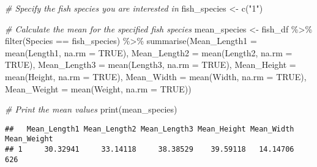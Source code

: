 \documentclass[
]{article}
\newenvironment{Shaded}{\begin{snugshade}}{\end{snugshade}}
\newcommand{\AttributeTok}[1]{\textcolor[rgb]{0.77,0.63,0.00}{#1}}
\newcommand{\CommentTok}[1]{\textcolor[rgb]{0.56,0.35,0.01}{\textit{#1}}}
\newcommand{\ConstantTok}[1]{\textcolor[rgb]{0.00,0.00,0.00}{#1}}
\newcommand{\FunctionTok}[1]{\textcolor[rgb]{0.00,0.00,0.00}{#1}}
\newcommand{\NormalTok}[1]{#1}
\newcommand{\OtherTok}[1]{\textcolor[rgb]{0.56,0.35,0.01}{#1}}
\newcommand{\SpecialCharTok}[1]{\textcolor[rgb]{0.00,0.00,0.00}{#1}}
\newcommand{\StringTok}[1]{\textcolor[rgb]{0.31,0.60,0.02}{#1}}
\begin{document}
\begin{Shaded}
\begin{Highlighting}[]
\CommentTok{\# Specify the fish species you are interested in}
\NormalTok{fish\_species }\OtherTok{\textless{}{-}} \FunctionTok{c}\NormalTok{(}\StringTok{"1"}\NormalTok{)}

\CommentTok{\# Calculate the mean for the specified fish species}
\NormalTok{mean\_species }\OtherTok{\textless{}{-}}\NormalTok{ fish\_df }\SpecialCharTok{\%\textgreater{}\%}
  \FunctionTok{filter}\NormalTok{(Species }\SpecialCharTok{==}\NormalTok{ fish\_species) }\SpecialCharTok{\%\textgreater{}\%}
  \FunctionTok{summarise}\NormalTok{(}\AttributeTok{Mean\_Length1 =} \FunctionTok{mean}\NormalTok{(Length1, }\AttributeTok{na.rm =} \ConstantTok{TRUE}\NormalTok{),}
            \AttributeTok{Mean\_Length2 =} \FunctionTok{mean}\NormalTok{(Length2, }\AttributeTok{na.rm =} \ConstantTok{TRUE}\NormalTok{),}
            \AttributeTok{Mean\_Length3 =} \FunctionTok{mean}\NormalTok{(Length3, }\AttributeTok{na.rm =} \ConstantTok{TRUE}\NormalTok{),}
            \AttributeTok{Mean\_Height =} \FunctionTok{mean}\NormalTok{(Height, }\AttributeTok{na.rm =} \ConstantTok{TRUE}\NormalTok{),}
            \AttributeTok{Mean\_Width =} \FunctionTok{mean}\NormalTok{(Width, }\AttributeTok{na.rm =} \ConstantTok{TRUE}\NormalTok{),}
            \AttributeTok{Mean\_Weight =} \FunctionTok{mean}\NormalTok{(Weight, }\AttributeTok{na.rm =} \ConstantTok{TRUE}\NormalTok{))}

\CommentTok{\# Print the mean values}
\FunctionTok{print}\NormalTok{(mean\_species)}
\end{Highlighting}
\end{Shaded}

\begin{verbatim}
##   Mean_Length1 Mean_Length2 Mean_Length3 Mean_Height Mean_Width Mean_Weight
## 1     30.32941     33.14118     38.38529    39.59118   14.14706         626
\end{verbatim}
\end{document}
